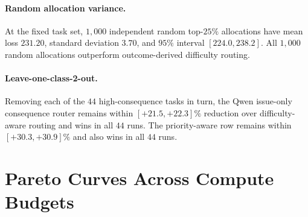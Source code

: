 \documentclass{article}
\begin{document}
\begin{table}[h]
\centering
\caption{\textbf{Task-level bootstrap} over $5{,}000$ resamples at the
top-$25\%$ matched-compute operating point.}
\label{tab:bootstrap}
\small
{}
\end{table}

\paragraph{Random allocation variance.}
At the fixed task set, $1{,}000$ independent random top-$25\%$
allocations have mean loss $231.20$, standard deviation $3.70$, and
$95\%$ interval $[224.0,238.2]$. All $1{,}000$ random allocations
outperform outcome-derived difficulty routing.

\paragraph{Leave-one-class-2-out.}
Removing each of the $44$ high-consequence tasks in turn, the Qwen
issue-only consequence router remains within $[+21.5,+22.3]\%$
reduction over difficulty-aware routing and wins in all $44$ runs. The
priority-aware row remains within $[+30.3,+30.9]\%$ and also wins in
all $44$ runs.

\section{Pareto Curves Across Compute Budgets}
\label{app:pareto}
\end{document}
